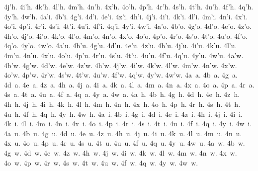 {4j'h.
4i'h.
4k'h.
4l'h.
4m'h.
4n'h.
4x'h.
4o'h.
4p'h.
4r'h.
4s'h.
4t'h.
4u'h.
4f'h.
4q'h.
4y'h.
4w'h.
4a'i.
4b'i.
4g'i.
4d'i.
4e'i.
4z'i.
4h'i.
4j'i.
4i'i.
4k'i.
4l'i.
4m'i.
4n'i.
4x'i.
4o'i.
4p'i.
4r'i.
4s'i.
4t'i.
4u'i.
4f'i.
4q'i.
4y'i.
4w'i.
4a'o.
4b'o.
4g'o.
4d'o.
4e'o.
4z'o.
4h'o.
4j'o.
4i'o.
4k'o.
4l'o.
4m'o.
4n'o.
4x'o.
4o'o.
4p'o.
4r'o.
4s'o.
4t'o.
4u'o.
4f'o.
4q'o.
4y'o.
4w'o.
4a'u.
4b'u.
4g'u.
4d'u.
4e'u.
4z'u.
4h'u.
4j'u.
4i'u.
4k'u.
4l'u.
4m'u.
4n'u.
4x'u.
4o'u.
4p'u.
4r'u.
4s'u.
4t'u.
4u'u.
4f'u.
4q'u.
4y'u.
4w'u.
4a'w.
4b'w.
4g'w.
4d'w.
4e'w.
4z'w.
4h'w.
4j'w.
4i'w.
4k'w.
4l'w.
4m'w.
4n'w.
4x'w.
4o'w.
4p'w.
4r'w.
4s'w.
4t'w.
4u'w.
4f'w.
4q'w.
4y'w.
4w'w.
4a~a.
4b~a.
4g~a.
4d~a.
4e~a.
4z~a.
4h~a.
4j~a.
4i~a.
4k~a.
4l~a.
4m~a.
4n~a.
4x~a.
4o~a.
4p~a.
4r~a.
4s~a.
4t~a.
4u~a.
4f~a.
4q~a.
4y~a.
4w~a.
4a~h.
4b~h.
4g~h.
4d~h.
4e~h.
4z~h.
4h~h.
4j~h.
4i~h.
4k~h.
4l~h.
4m~h.
4n~h.
4x~h.
4o~h.
4p~h.
4r~h.
4s~h.
4t~h.
4u~h.
4f~h.
4q~h.
4y~h.
4w~h.
4a~i.
4b~i.
4g~i.
4d~i.
4e~i.
4z~i.
4h~i.
4j~i.
4i~i.
4k~i.
4l~i.
4m~i.
4n~i.
4x~i.
4o~i.
4p~i.
4r~i.
4s~i.
4t~i.
4u~i.
4f~i.
4q~i.
4y~i.
4w~i.
4a~u.
4b~u.
4g~u.
4d~u.
4e~u.
4z~u.
4h~u.
4j~u.
4i~u.
4k~u.
4l~u.
4m~u.
4n~u.
4x~u.
4o~u.
4p~u.
4r~u.
4s~u.
4t~u.
4u~u.
4f~u.
4q~u.
4y~u.
4w~u.
4a~w.
4b~w.
4g~w.
4d~w.
4e~w.
4z~w.
4h~w.
4j~w.
4i~w.
4k~w.
4l~w.
4m~w.
4n~w.
4x~w.
4o~w.
4p~w.
4r~w.
4s~w.
4t~w.
4u~w.
4f~w.
4q~w.
4y~w.
4w~w.
}
\endinput
 

